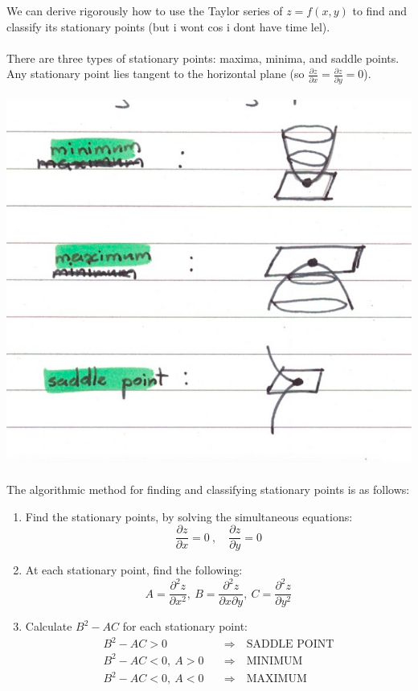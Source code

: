 \documentclass{scrartcl}
\begin{document}
We can derive rigorously how to use the Taylor series of $ z = f(x, y) $ to find and classify its stationary points (but i wont cos i dont have time lel).
\\\\
There are three types of stationary points: maxima, minima, and saddle points. Any stationary point lies tangent to the horizontal plane (so $ \frac{\partial z}{\partial x} = \frac{\partial z}{\partial y} = 0 $).
\\\\
\hspace*{1.5in}
\includegraphics[scale=0.3]{stationarypoints}
\\\\
The algorithmic method for finding and classifying stationary points is as follows:
\begin{enumerate}
\item Find the stationary points, by solving the simultaneous equations:
\begin{equation}
\frac{\partial z}{\partial x} = 0 \ , \quad \frac{\partial z}{\partial y} = 0
\end{equation}
\item At each stationary point, find the following:
\begin{equation}
A = \frac{\partial^{2} z}{\partial x^{2}}, \ B = \frac{\partial^{2} z}{\partial x \partial y}, \ C = \frac{\partial^{2} z}{\partial y^{2}}
\end{equation}
\item Calculate $ B^{2} - AC $ for each stationary point:
\begin{align}
B^{2} - AC > 0 \quad & \Rightarrow \quad \textrm{SADDLE POINT} \\
B^{2} - AC < 0, \ A > 0 \quad & \Rightarrow \quad \textrm{MINIMUM} \\
B^{2} - AC < 0, \ A < 0 \quad & \Rightarrow \quad \textrm{MAXIMUM} \\
\end{align}
\end{enumerate}
\end{document}
